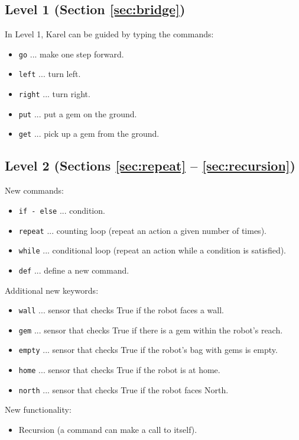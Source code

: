 \subsection{Level 1 (Section \ref{sec:bridge})}

In Level 1, Karel can be guided by typing the commands:
\begin{itemize}
\item {\tt go} ... make one step forward.
\item {\tt left} ... turn left.
\item {\tt right} ... turn right.
\item {\tt put} ... put a gem on the ground.
\item {\tt get} ... pick up a gem from the ground.
\end{itemize}

\subsection{Level 2 (Sections \ref{sec:repeat} -- \ref{sec:recursion})}

New commands:
\begin{itemize}
\item {\tt if - else} ... condition.
\item {\tt repeat} ... counting loop (repeat an action a given number of times).
\item {\tt while} ... conditional loop (repeat an action while a condition is satisfied).
\item {\tt def} ... define a new command.
\end{itemize}
Additional new keywords:
\begin{itemize}
\item {\tt wall} ... sensor that checks True if the robot faces a wall.
\item {\tt gem} ... sensor that checks True if there is a gem within the robot's reach.
\item {\tt empty} ... sensor that checks True if the robot's bag with gems is empty.
\item {\tt home} ... sensor that checks True if the robot is at home.
\item {\tt north} ... sensor that checks True if the robot faces North.
\end{itemize}
New functionality:
\begin{itemize}
\item Recursion (a command can make a call to itself).
\end{itemize}

